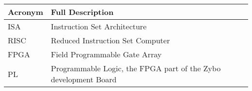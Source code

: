 \begin{table}[H]
	\begin{tabularx}{\textwidth}{| a | x |}
		\hline
		\textbf{Acronym} & \textbf{Full Description}                                       \\
		\hline
		ISA              & Instruction Set Architecture                                    \\
		RISC             & Reduced Instruction Set Computer                                \\
		FPGA             & Field Programmable Gate Array                                   \\
		PL               & Programmable Logic, the FPGA part of the Zybo development Board \\
		\hline
	\end{tabularx}
\end{table}

